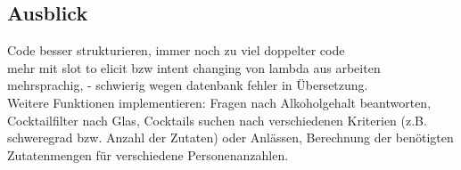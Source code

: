 \documentclass[12pt,letterpaper]{article}
\begin{document}
\subsection{Ausblick}
Code besser strukturieren, immer noch zu viel doppelter code\\
mehr mit slot to elicit bzw intent changing von lambda aus arbeiten\\
mehrsprachig, - schwierig wegen datenbank fehler in Übersetzung.\\
Weitere Funktionen implementieren: Fragen nach Alkoholgehalt beantworten, Cocktailfilter nach Glas, Cocktails suchen nach verschiedenen Kriterien (z.B. schweregrad bzw. Anzahl der Zutaten) oder Anlässen, Berechnung der benötigten Zutatenmengen für verschiedene Personenanzahlen.
\end{document}
